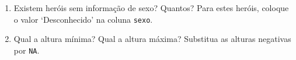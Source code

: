 \documentclass[
  11pt]{report}
\begin{document}
\begin{enumerate}

\item
  Existem heróis sem informação de sexo? Quantos? Para estes heróis, coloque o valor `Desconhecido' na coluna \texttt{sexo}.

\item
  Qual a altura mínima? Qual a altura máxima? Substitua as alturas negativas por \texttt{NA}.

\end{enumerate}
\end{document}
